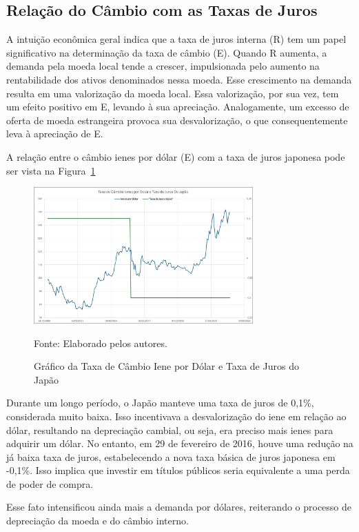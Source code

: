 \documentclass[a4paper,12pt]{article}[abntex2]
\begin{document}
\subsection{\textbf{Relação do Câmbio com as Taxas de Juros}}
A intuição econômica geral indica que a taxa de juros interna (R) tem um papel significativo na determinação da taxa de câmbio (E). Quando R aumenta, a demanda pela moeda local tende a crescer, impulsionada pelo aumento na rentabilidade dos ativos denominados nessa moeda. Esse crescimento na demanda resulta em uma valorização da moeda local. Essa valorização, por sua vez, tem um efeito positivo em E, levando à sua apreciação. Analogamente, um excesso de oferta de moeda estrangeira provoca sua desvalorização, o que consequentemente leva à apreciação de E.

A relação entre o câmbio ienes por dólar (E) com a taxa de juros japonesa pode ser vista na Figura~\ref{fig:cambioJurosJapao}
 \begin{figure}[H]
    \centering
    \caption{Gráfico da Taxa de Câmbio Iene por Dólar e Taxa de Juros do Japão} 
    \includegraphics[width=0.75\textwidth]{Câmbio e Juros japoneses.png}
    \label{fig:cambioJurosJapao}
    
    \footnotesize{Fonte: Elaborado pelos autores.}
    \end{figure}

Durante um longo período, o Japão manteve uma taxa de juros de 0,1\%, considerada muito baixa. Isso incentivava a desvalorização do iene em relação ao dólar, resultando na depreciação cambial, ou seja, era preciso mais ienes para adquirir um dólar. No entanto, em 29 de fevereiro de 2016, houve uma redução na já baixa taxa de juros, estabelecendo a nova taxa básica de juros japonesa em -0,1\%. Isso implica que investir em títulos públicos seria equivalente a uma perda de poder de compra.

Esse fato intensificou ainda mais a demanda por dólares, reiterando o processo de depreciação da moeda e do câmbio interno.
\end{document}
